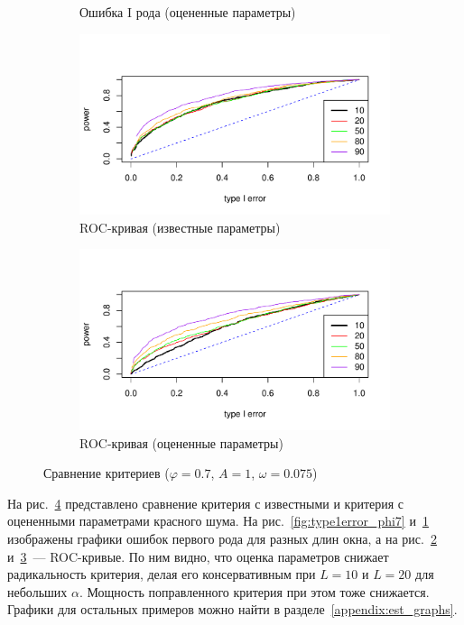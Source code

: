 \documentclass[specialist,
substylefile = spbu_report.rtx,
subf,href,colorlinks=true, 12pt]{disser}
\theoremstyle{definition}
\begin{document}
\begin{figure}[h!]
\begin{subfigure}[t]{0.5\textwidth}
		\caption{Ошибка I рода (оцененные параметры)}
		\label{fig:type1error_phi7est}
	\end{subfigure}
	\bigskip
	\begin{subfigure}[t]{0.5\textwidth}
		\centering
		\includegraphics[width=\textwidth]{img/roc_phi7_omega0075.pdf}
		\caption{ROC-кривая (известные параметры)}
		\label{fig:roc_phi7_omega0075}
	\end{subfigure}\hspace{\fill}
	\begin{subfigure}[t]{0.5\textwidth}
		\centering
		\includegraphics[width=\textwidth]{img/roc_phi7est_omega0075.pdf}
		\caption{ROC-кривая (оцененные параметры)}
		\label{fig:roc_phi7est_omega0075}
	\end{subfigure}
	\caption{Сравнение критериев ($\varphi=0.7$, $A=1$, $\omega=0.075$)}
	\label{fig:est_comp}
\end{figure}

На рис.~\ref{fig:est_comp} представлено сравнение критерия с известными и критерия с оцененными параметрами красного шума. На рис.~\ref{fig:type1error_phi7} и~\ref{fig:type1error_phi7est} изображены графики ошибок первого рода для разных длин окна, а на рис.~\ref{fig:roc_phi7_omega0075} и~\ref{fig:roc_phi7est_omega0075}~--- ROC-кривые. По ним видно, что оценка параметров снижает радикальность критерия, делая его консервативным при $L=10$ и $L=20$ для небольших $\alpha$. Мощность поправленного критерия при этом тоже снижается. Графики для остальных примеров можно найти в разделе~\ref{appendix:est_graphs}.
\end{document}
